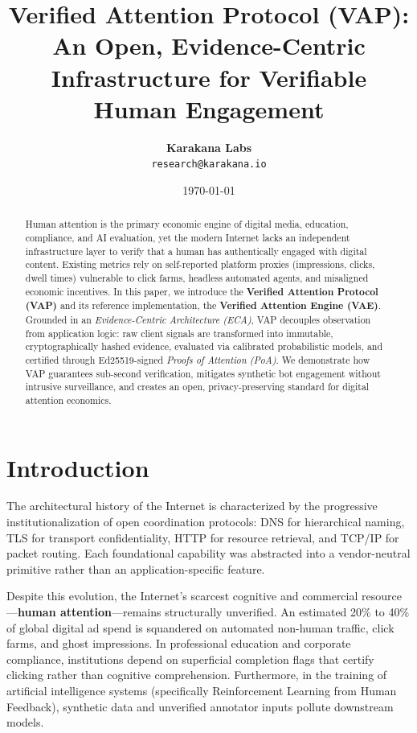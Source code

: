 \documentclass[10pt,twocolumn,letterpaper]{article}
\title{\textbf{Verified Attention Protocol (VAP):}\\
An Open, Evidence-Centric Infrastructure for Verifiable Human Engagement}
\author{
  \textbf{Karakana Labs} \\
  \texttt{research@karakana.io}
}
\date{\today}
\begin{document}
\maketitle

\begin{abstract}
Human attention is the primary economic engine of digital media, education, compliance, and AI evaluation, yet the modern Internet lacks an independent infrastructure layer to verify that a human has authentically engaged with digital content. Existing metrics rely on self-reported platform proxies (impressions, clicks, dwell times) vulnerable to click farms, headless automated agents, and misaligned economic incentives. In this paper, we introduce the \textbf{Verified Attention Protocol (VAP)} and its reference implementation, the \textbf{Verified Attention Engine (VAE)}. Grounded in an \emph{Evidence-Centric Architecture (ECA)}, VAP decouples observation from application logic: raw client signals are transformed into immutable, cryptographically hashed evidence, evaluated via calibrated probabilistic models, and certified through Ed25519-signed \emph{Proofs of Attention (PoA)}. We demonstrate how VAP guarantees sub-second verification, mitigates synthetic bot engagement without intrusive surveillance, and creates an open, privacy-preserving standard for digital attention economics.
\end{abstract}

\section{Introduction}
The architectural history of the Internet is characterized by the progressive institutionalization of open coordination protocols: DNS for hierarchical naming, TLS for transport confidentiality, HTTP for resource retrieval, and TCP/IP for packet routing. Each foundational capability was abstracted into a vendor-neutral primitive rather than an application-specific feature.

Despite this evolution, the Internet's scarcest cognitive and commercial resource—\textbf{human attention}—remains structurally unverified. An estimated 20\% to 40\% of global digital ad spend is squandered on automated non-human traffic, click farms, and ghost impressions. In professional education and corporate compliance, institutions depend on superficial completion flags that certify clicking rather than cognitive comprehension. Furthermore, in the training of artificial intelligence systems (specifically Reinforcement Learning from Human Feedback), synthetic data and unverified annotator inputs pollute downstream models.
\end{document}
